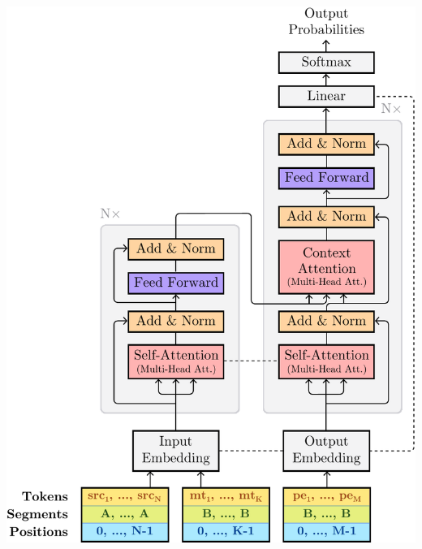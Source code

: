 \documentclass[xetex,aspectratio=169,xcolor,professionalfonts,hyperref]{beamer}
\begin{document}
\begin{frame}
\begin{columns}
    \begin{column}{0.4\columnwidth}
    \vspace{-1.5cm}
    \begin{center}
    \includegraphics[width=0.8\columnwidth]{figures/diagram_8-dashed.pdf}
    \end{center}
    \end{column}
    \end{columns}
\end{frame}
\end{document}
